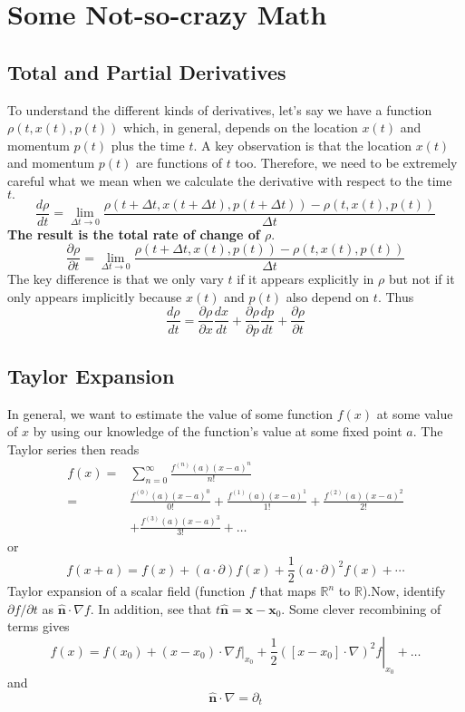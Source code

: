 \chapter{Some Not-so-crazy Math}

\section{Total and Partial Derivatives}
To understand the different kinds of derivatives, let's say we have a function $\rho(t, x(t), p(t))$ which, in general, depends on the location $x(t)$ and momentum $p(t)$ plus the time $t.$ A key observation is that the location $x(t)$ and momentum $p(t)$ are functions of $t$ too. Therefore, we need to be extremely careful what we mean when we calculate the derivative with respect to the time $t .$
$$
\frac{d \rho}{d t}=\lim _{\Delta t \rightarrow 0} \frac{\rho(t+\Delta t, x(t+\Delta t), p(t+\Delta t))-\rho(t, x(t), p(t))}{\Delta t}
$$
\textbf{The result is the total rate of change of $\rho$}.
$$
\frac{\partial \rho}{\partial t}=\lim _{\Delta t \rightarrow 0} \frac{\rho(t+\Delta t, x(t), p(t))-\rho(t, x(t), p(t))}{\Delta t}
$$
The key difference is that we only vary $t$ if it appears explicitly
in $\rho$ but not if it only appears implicitly because $x(t)$ and $p(t)$
also depend on $t .$ Thus
$$
\frac{d \rho}{d t}=\frac{\partial \rho}{\partial x} \frac{d x}{d t}+\frac{\partial \rho}{\partial p} \frac{d p}{d t}+\frac{\partial \rho}{\partial t}
$$
\section{Taylor Expansion}
In general, we want to estimate the value of some function $f(x)$ at some value of $x$ by using our knowledge of the function's value at some fixed point $a .$ The Taylor series then reads
\begin{equation}
\begin{aligned}
f(x)=& \sum_{n=0}^{\infty} \frac{f^{(n)}(a)(x-a)^{n}}{n !} \\
=& \frac{f^{(0)}(a)(x-a)^{0}}{0 !}+\frac{f^{(1)}(a)(x-a)^{1}}{1 !}+\frac{f^{(2)}(a)(x-a)^{2}}{2 !} \\
&+\frac{f^{(3)}(a)(x-a)^{3}}{3 !}+\ldots
\end{aligned}
\end{equation}
or
\begin{equation}
f(x+a)=f(x)+(a \cdot \partial) f(x)+\frac{1}{2}(a \cdot \partial)^{2} f(x)+\cdots
\end{equation}
Taylor expansion of a scalar field (function $f$ that maps $\mathbb{R}^{n}$ to $\mathbb{R}$).Now, identify $\partial f / \partial t$ as $\hat{\boldsymbol{n}} \cdot \nabla f .$ In addition, see that $t \hat{\boldsymbol{n}}=\boldsymbol{x}-\boldsymbol{x}_{0} .$ Some clever recombining of terms gives
\begin{equation}
f(x)=f\left(x_{0}\right)+\left.\left(x-x_{0}\right) \cdot \nabla f\right|_{x_{0}}+\left.\frac{1}{2}\left(\left[x-x_{0}\right] \cdot \nabla\right)^{2} f\right|_{x_{0}}+\ldots
\end{equation}
and
\begin{equation}
\hat{\boldsymbol{n}} \cdot \nabla=\partial_{t}
\end{equation}

